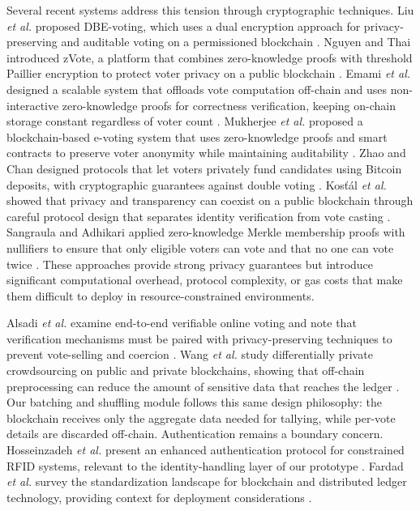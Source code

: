 \documentclass{ieeeaccess}
\begin{document}
Several recent systems address this tension through cryptographic techniques. Liu \emph{et al.} proposed DBE-voting, which uses a dual encryption approach for privacy-preserving and auditable voting on a permissioned blockchain \cite{Liu2023}. Nguyen and Thai introduced zVote, a platform that combines zero-knowledge proofs with threshold Paillier encryption to protect voter privacy on a public blockchain \cite{Nguyen2022}. Emami \emph{et al.} designed a scalable system that offloads vote computation off-chain and uses non-interactive zero-knowledge proofs for correctness verification, keeping on-chain storage constant regardless of voter count \cite{Emami2023}. Mukherjee \emph{et al.} proposed a blockchain-based e-voting system that uses zero-knowledge proofs and smart contracts to preserve voter anonymity while maintaining auditability \cite{Mukherjee2023}. Zhao and Chan designed protocols that let voters privately fund candidates using Bitcoin deposits, with cryptographic guarantees against double voting \cite{Zhao2016}. Kosťál \emph{et al.} showed that privacy and transparency can coexist on a public blockchain through careful protocol design that separates identity verification from vote casting \cite{Kostal2019}. Sangraula and Adhikari applied zero-knowledge Merkle membership proofs with nullifiers to ensure that only eligible voters can vote and that no one can vote twice \cite{Sangraula2025}. These approaches provide strong privacy guarantees but introduce significant computational overhead, protocol complexity, or gas costs that make them difficult to deploy in resource-constrained environments.

Alsadi \emph{et al.} examine end-to-end verifiable online voting and note that verification mechanisms must be paired with privacy-preserving techniques to prevent vote-selling and coercion \cite{Alsadi2024}. Wang \emph{et al.} study differentially private crowdsourcing on public and private blockchains, showing that off-chain preprocessing can reduce the amount of sensitive data that reaches the ledger \cite{Wang2023}. Our batching and shuffling module follows this same design philosophy: the blockchain receives only the aggregate data needed for tallying, while per-vote details are discarded off-chain. Authentication remains a boundary concern. Hosseinzadeh \emph{et al.} present an enhanced authentication protocol for constrained RFID systems, relevant to the identity-handling layer of our prototype \cite{Hosseinzadeh2024}. Fardad \emph{et al.} survey the standardization landscape for blockchain and distributed ledger technology, providing context for deployment considerations \cite{Fardad2025}.
\end{document}
